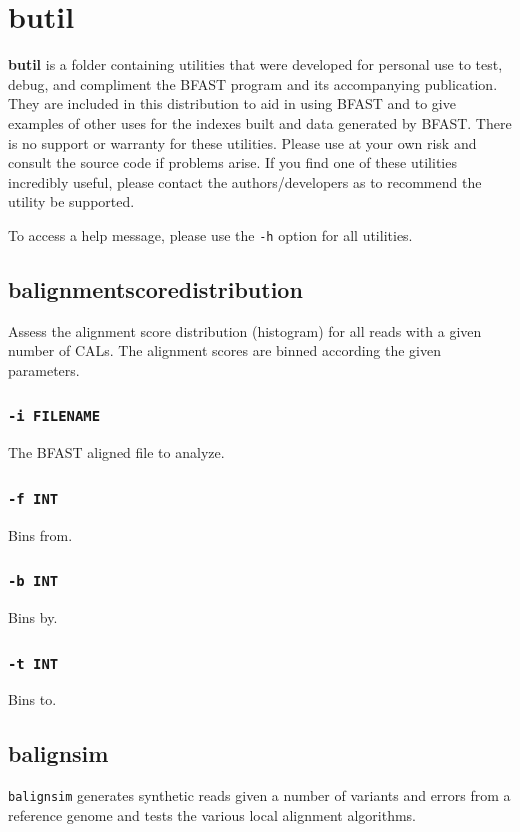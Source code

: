 \documentclass[a4paper,12pt]{book}
\newcommand{\TT}[1]{{\tt #1}} %
\newcommand{\BF}[1]{{\bf #1}} %
\newcommand{\BAF}{BFAST aligned file} %
\begin{document}
\section{butil}
\label{sec:butil}
\BF{butil} is a folder containing utilities that were developed for personal use to test, debug, and compliment the BFAST program and its accompanying publication.  
They are included in this distribution to aid in using BFAST and to give examples of other uses for the indexes built and data generated by BFAST.
There is no support or warranty for these utilities.  
Please use at your own risk and consult the source code if problems arise.  
If you find one of these utilities incredibly useful, please contact the authors/developers as to recommend the utility be supported.

To access a help message, please use the \TT{-h} option for all utilities.

\subsection{balignmentscoredistribution}
\label{sec:balignmentscoredistribution}
Assess the alignment score distribution (histogram) for all reads with a given number of CALs.
The alignment scores are binned according the given parameters.
\subsubsection{\TT{-i FILENAME}}
The \BAF{} to analyze.
\subsubsection{\TT{-f INT}}
Bins from.
\subsubsection{\TT{-b INT}}
Bins by.
\subsubsection{\TT{-t INT}}
Bins to.
\subsection{balignsim}
\label{sec:balignsim}
\TT{balignsim} generates synthetic reads given a number of variants and errors from a reference genome and tests the various local alignment algorithms.
\end{document}
